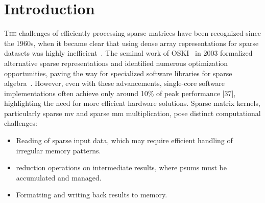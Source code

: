 
\section{Introduction}
\label{sec:soa:intro}

\lettrine{T}{he} challenges of efficiently processing sparse matrices have been recognized since the 1960s, when it became clear that using dense array representations for sparse datasets was highly inefficient~\cite{Saad2003_COO_CSR_DIA_ELL}.
The seminal work of OSKI~\cite{Vuduc2005} in 2003 formalized alternative sparse representations and identified numerous optimization opportunities, paving the way for specialized software libraries for sparse algebra~\cite{Williams2007}.
However, even with these advancements, single-core software implementations often achieve only around 10\% of peak performance [37], highlighting the need for more efficient hardware solutions.
Sparse matrix kernels, particularly sparse \acrfull{mv} and sparse \acrfull{mm} multiplication, pose distinct computational challenges:
\begin{itemize}
    \item Reading of sparse input data, which may require efficient handling of irregular memory patterns.
    \item \Gls{reduction} operations on intermediate results, where \glspl{psum} must be accumulated and managed.
    \item Formatting and writing back results to memory.
\end{itemize}

